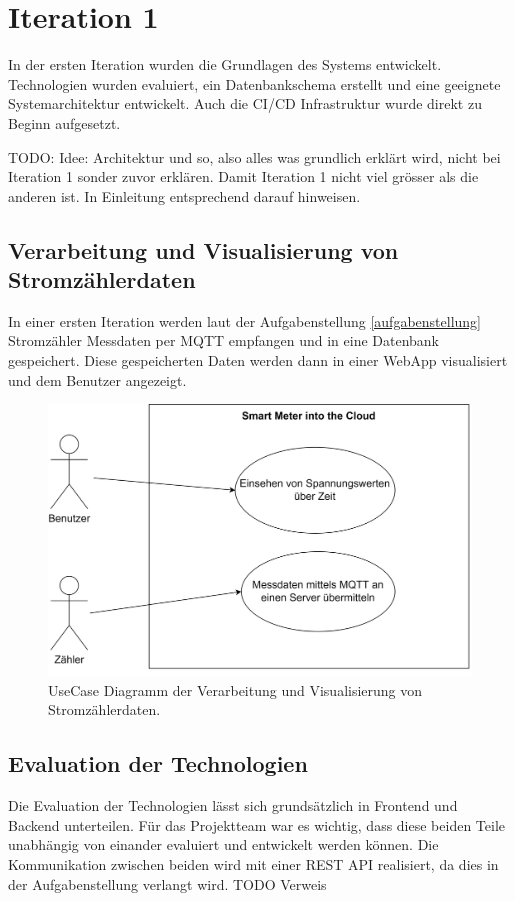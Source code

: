 \section{Iteration 1}
In der ersten Iteration wurden die Grundlagen des Systems entwickelt.
Technologien wurden evaluiert, ein Datenbankschema erstellt und eine geeignete Systemarchitektur entwickelt.
Auch die \ac{CI/CD} Infrastruktur wurde direkt zu Beginn aufgesetzt.

TODO: Idee: Architektur und so, also alles was grundlich erklärt wird, nicht bei Iteration 1 sonder zuvor erklären.
Damit Iteration 1 nicht viel grösser als die anderen ist. In Einleitung entsprechend darauf hinweisen.

\subsection{Verarbeitung und Visualisierung von Stromzählerdaten}



In einer ersten Iteration werden laut der Aufgabenstellung \ref{aufgabenstellung} Stromzähler
Messdaten per \ac{MQTT} empfangen und in eine Datenbank gespeichert.
Diese gespeicherten Daten werden dann in einer WebApp visualisiert und dem Benutzer
angezeigt.

\begin{figure}[h]
    \centering
    \includegraphics[width=1.0\textwidth]{gfx/usecase1}
    \caption{
        UseCase Diagramm der Verarbeitung und Visualisierung von Stromzählerdaten.
    }
    \label{fig:usecase1}
\end{figure}

\subsection{Evaluation der Technologien}
\label{p1:evaluation_tech}
Die Evaluation der Technologien lässt sich grundsätzlich in Frontend und Backend unterteilen.
Für das Projektteam war es wichtig, dass diese beiden Teile unabhängig von einander evaluiert und entwickelt werden können.
Die Kommunikation zwischen beiden wird mit einer \ac{REST} \ac{API} realisiert, da dies in der Aufgabenstellung verlangt wird. TODO Verweis

